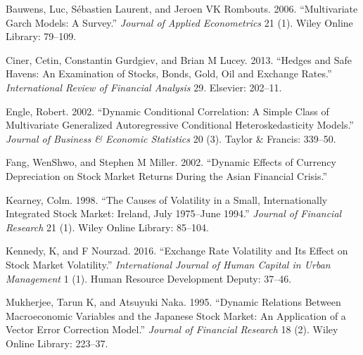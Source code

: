 \documentclass[11pt,preprint, authoryear]{elsarticle}
\numberwithin{equation}{section}
\numberwithin{figure}{section}
\numberwithin{table}{section}
\begin{document}
\hypertarget{ref-bauwens2006}{}
Bauwens, Luc, Sébastien Laurent, and Jeroen VK Rombouts. 2006.
``Multivariate Garch Models: A Survey.'' \emph{Journal of Applied
Econometrics} 21 (1). Wiley Online Library: 79--109.

\hypertarget{ref-ciner2013}{}
Ciner, Cetin, Constantin Gurdgiev, and Brian M Lucey. 2013. ``Hedges and
Safe Havens: An Examination of Stocks, Bonds, Gold, Oil and Exchange
Rates.'' \emph{International Review of Financial Analysis} 29. Elsevier:
202--11.

\hypertarget{ref-engle2002}{}
Engle, Robert. 2002. ``Dynamic Conditional Correlation: A Simple Class
of Multivariate Generalized Autoregressive Conditional
Heteroskedasticity Models.'' \emph{Journal of Business \& Economic
Statistics} 20 (3). Taylor \& Francis: 339--50.

\hypertarget{ref-fang2002}{}
Fang, WenShwo, and Stephen M Miller. 2002. ``Dynamic Effects of Currency
Depreciation on Stock Market Returns During the Asian Financial
Crisis.''

\hypertarget{ref-kearney1998}{}
Kearney, Colm. 1998. ``The Causes of Volatility in a Small,
Internationally Integrated Stock Market: Ireland, July 1975--June
1994.'' \emph{Journal of Financial Research} 21 (1). Wiley Online
Library: 85--104.

\hypertarget{ref-kennedy2016}{}
Kennedy, K, and F Nourzad. 2016. ``Exchange Rate Volatility and Its
Effect on Stock Market Volatility.'' \emph{International Journal of
Human Capital in Urban Management} 1 (1). Human Resource Development
Deputy: 37--46.

\hypertarget{ref-mukherjee1995}{}
Mukherjee, Tarun K, and Atsuyuki Naka. 1995. ``Dynamic Relations Between
Macroeconomic Variables and the Japanese Stock Market: An Application of
a Vector Error Correction Model.'' \emph{Journal of Financial Research}
18 (2). Wiley Online Library: 223--37.

\newpage
\nocite{*}

\end{document}
